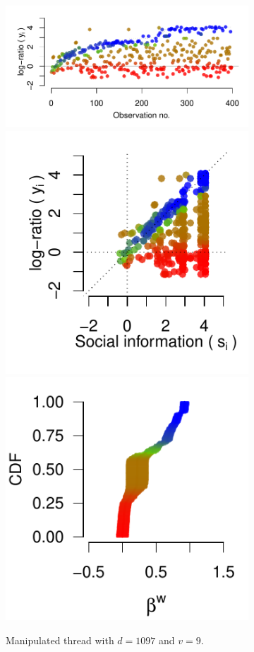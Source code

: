 \documentclass[9pt,a4paper,twocolumn,lineno]{article}
\begin{document}
\begin{figure}[h]
\begin{subfigure}{.44\linewidth}
	\end{subfigure}
	\begin{subfigure}{.44\linewidth}
		\centering
		\includegraphics[width=1\linewidth]{threads/thread_max_1097_9.pdf}
		\includegraphics[width=.48\linewidth]{info/info_max_1097_9.pdf}
		\includegraphics[width=.48\linewidth]{betas/beta_max_1097_9.pdf}
		\caption{\footnotesize Manipulated thread with $d=1097$ and $v=9$.}
		\label{fig: h=max d=1097, v=9}
	\end{subfigure}
	\begin{subfigure}{.1\linewidth}
		\centering

\end{subfigure}
\end{figure}
\end{document}
